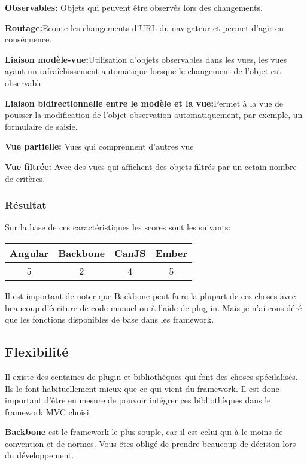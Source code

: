 \textbf{Observables:} Objets qui peuvent être observés lors des changements.

\textbf{Routage:}Ecoute les changements d’URL du navigateur et permet d’agir en conséquence.

\textbf{Liaison modèle-vue:}Utilisation d’objets observables dans les vues, les vues ayant un rafraîchissement automatique lorsque le changement de l’objet est observable.

\textbf{Liaison bidirectionnelle entre le modèle et la vue:}Permet à la vue de pousser la modification de l’objet observation automatiquement, par exemple, un formulaire de saisie.

\textbf{Vue partielle:} Vues qui comprennent d’autres vue

\textbf{Vue filtrée:} Avec des vues qui affichent des objets filtrés par un cetain nombre de critères.

\subsubsection{Résultat}

Sur la base de ces caractéristiques les scores sont les suivants: 

\begin{tabular}{|c|c|c|c|}
  \hline 
  Angular & Backbone & CanJS & Ember \\
  \hline 
  5 & 2 & 4 & 5 \\
  \hline
\end{tabular}

Il est important de noter que Backbone peut faire la plupart de ces choses avec beaucoup d’écriture de code manuel ou à l’aide de plug-in. Mais je n’ai considéré que les fonctions disponibles de base dans les framework.

\subsection{Flexibilité}

Il existe des centaines de plugin et bibliothèques qui font des choses spécilalisés. Ils le font habituellement mieux que ce qui vient du framework. Il est donc important d’être en mesure de pouvoir intégrer ces bibliothèques dans le framework MVC choisi.

\textbf{Backbone} est le framework le plus souple, car il est celui qui à le moins de convention et de normes. Vous êtes obligé de prendre beaucoup de décision lors du développement.

